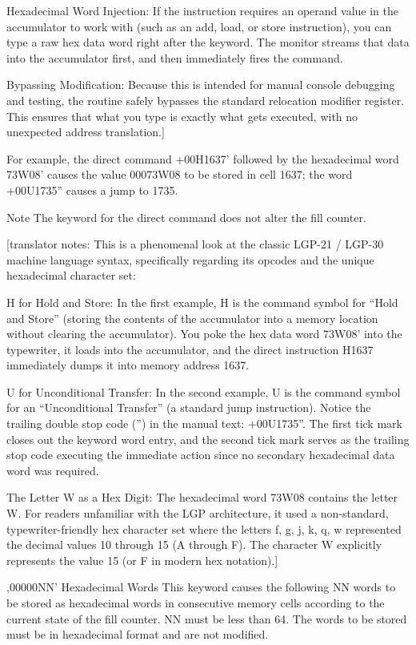 \documentclass{article}
\begin{document}
\begin{enumerate}
Hexadecimal Word Injection: If the instruction requires an operand value in the accumulator to work with (such as an add, load, or store instruction), you can type a raw hex data word right after the keyword. The monitor streams that data into the accumulator first, and then immediately fires the command.

Bypassing Modification: Because this is intended for manual console debugging and testing, the routine safely bypasses the standard relocation modifier register. This ensures that what you type is exactly what gets executed, with no unexpected address translation.]

For example, the direct command +00H1637' followed by the hexadecimal word 73W08' causes the value 00073W08 to be stored in cell 1637; the word +00U1735'' causes a jump to 1735.

Note
The keyword for the direct command does not alter the fill counter.

[translator notes: This is a phenomenal look at the classic LGP-21 / LGP-30 machine language syntax, specifically regarding its opcodes and the unique hexadecimal character set:

H for Hold and Store: In the first example, H is the command symbol for ``Hold and Store'' (storing the contents of the accumulator into a memory location without clearing the accumulator). You poke the hex data word 73W08' into the typewriter, it loads into the accumulator, and the direct instruction H1637 immediately dumps it into memory address 1637.

U for Unconditional Transfer: In the second example, U is the command symbol for an ``Unconditional Transfer'' (a standard jump instruction). Notice the trailing double stop code ('') in the manual text: +00U1735''. The first tick mark closes out the keyword word entry, and the second tick mark serves as the trailing stop code executing the immediate action since no secondary hexadecimal data word was required.

The Letter W as a Hex Digit: The hexadecimal word 73W08 contains the letter W. For readers unfamiliar with the LGP architecture, it used a non-standard, typewriter-friendly hex character set where the letters f, g, j, k, q, w represented the decimal values 10 through 15 (A through F). The character W explicitly represents the value 15 (or F in modern hex notation).]

,00000NN' Hexadecimal Words
This keyword causes the following NN words to be stored as hexadecimal words in consecutive memory cells according to the current state of the fill counter. NN must be less than 64. The words to be stored must be in hexadecimal format and are not modified.


\end{enumerate}
\end{document}
